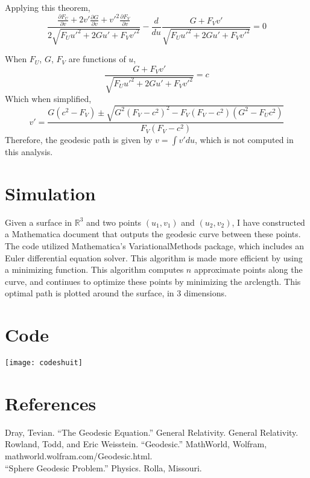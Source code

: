 \documentclass{article}
\begin{document}
Applying this theorem, 
\begin{equation}
\frac{\frac{\partial F_U}{\partial v} + 2v'\frac{\partial G}{\partial v} + v'^2\frac{\partial F_V}{\partial v}}{2\sqrt{F_U u'^2 + 2Gu' + F_V v'^2}} - \frac{d}{du}\frac{G + F_V v'}{\sqrt{F_U u'^2 + 2Gu' + F_V v'^2}} =0
\end{equation}

When $F_U$, $G$, $F_V$ are functions of $u$,
\begin{equation}
    \frac{G+F_V v'}{\sqrt{F_U u'^2 + 2Gu' + F_V v'^2}} = c
\end{equation}
Which when simplified,
\begin{equation}
    v' = \frac{G(c^2 - F_V) \pm \sqrt{G^2 (F_V - c^2)^2 - F_V (F_V - c^2)(G^2 - F_U c^2)}}{F_V (F_V - c^2)}
\end{equation}
Therefore, the geodesic path is given by $v = \int v' du$, which is not computed in this analysis.

\section{Simulation}
Given a surface in $\mathbb{R}^3$ and two points $(u_1,v_1)$ and $(u_2, v_2)$, I have constructed a Mathematica document that outputs the geodesic curve between these points. The code utilized Mathematica's VariationalMethods package, which includes an Euler differential equation solver. This algorithm is made more efficient by using a minimizing function. This algorithm computes $n$ approximate points along the curve, and continues to optimize these points by minimizing the arclength. This optimal path is plotted around the surface, in $3$ dimensions.

\section{Code}
\texttt{[image: codeshuit]}

\section{References}
Dray, Tevian. “The Geodesic Equation.” General Relativity. General Relativity.\\
Rowland, Todd, and Eric Weisstein. “Geodesic.” MathWorld, Wolfram, mathworld.wolfram.com/Geodesic.html.\\
“Sphere Geodesic Problem.” Physics. Rolla, Missouri.


\end{document}
